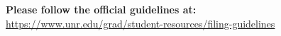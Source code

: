 \thispagestyle{fancyplain}
\doublespacing
\textbf{Please follow the official guidelines at: } \\
\url{https://www.unr.edu/grad/student-resources/filing-guidelines}